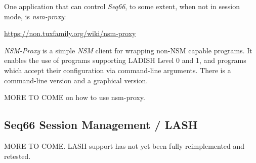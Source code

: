   One application that can control \textsl{Seq66}, to some extent, when not in
   session mode, is \textsl{nsm-proxy}:

      \url{https://non.tuxfamily.org/wiki/nsm-proxy}

   \textsl{NSM-Proxy} is a simple \textsl{NSM} client for wrapping non-NSM
   capable programs. It enables the use of programs supporting LADISH Level 0
   and 1, and programs which accept their configuration via command-line
   arguments.  There is a command-line version and a graphical version.

   MORE TO COME on how to use nsm-proxy.

\subsection{Seq66 Session Management / LASH}
\label{subsec:sessions_lash}

   MORE TO COME.
   LASH support has not yet been fully reimplemented and retested.

